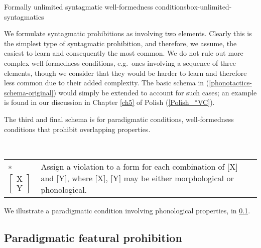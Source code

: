 \begin{dadpbox}{Formally unlimited syntagmatic well-formedness conditions}{box-unlimited-syntagmatics}

We formulate syntagmatic prohibitions as involving two elements. Clearly this is the simplest type of syntagmatic prohibition, and therefore, we assume, the easiest to learn and consequently the most common. We do not rule out more complex well-formedness conditions, e.g.\ ones involving a sequence of three elements, though we consider that they would be harder to learn and therefore less common due to their added complexity. The basic schema in (\ref{phonotactics-schema-original}) would simply be extended to account for such cases; an example is found in our discussion in Chapter \ref{ch5} of %
Polish (\ref{Polish_*VC}).
\end{dadpbox}

The third and final schema is for paradigmatic conditions, well-formedness conditions that prohibit overlapping properties.%

\begin{example}  \label{paradigmatic-schema-original}\smallskip\\
    \begin{tabularx}{\linewidth}{@{}lQ@{}}
         & Assign a violation to a form for each combination of [X] and [Y], where [X], [Y] may be either morphological or phonological.\\
    \end{tabularx}
\end{example}

We illustrate a paradigmatic condition involving phonological properties, in \textsection\ref{section-paradigmatic-condition-example}.

\subsection{Paradigmatic featural prohibition}\label{section-paradigmatic-condition-example}

